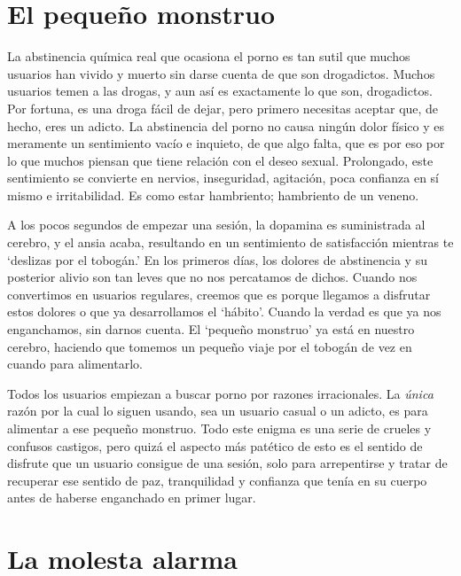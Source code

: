 \documentclass[
  spanish,
  openany]{book}
\begin{document}
\hypertarget{el-pequeuxf1o-monstruo}{%
\section{El pequeño monstruo}\label{el-pequeuxf1o-monstruo}}

La abstinencia química real que ocasiona el porno es tan sutil que muchos usuarios han vivido y muerto sin darse cuenta de que son drogadictos. Muchos usuarios temen a las drogas, y aun así es exactamente lo que son, drogadictos. Por fortuna, es una droga fácil de dejar, pero primero necesitas aceptar que, de hecho, eres un adicto. La abstinencia del porno no causa ningún dolor físico y es meramente un sentimiento vacío e inquieto, de que algo falta, que es por eso por lo que muchos piensan que tiene relación con el deseo sexual. Prolongado, este sentimiento se convierte en nervios, inseguridad, agitación, poca confianza en sí mismo e irritabilidad. Es como estar hambriento; hambriento de un veneno.

A los pocos segundos de empezar una sesión, la dopamina es suministrada al cerebro, y el ansia acaba, resultando en un sentimiento de satisfacción mientras te `deslizas por el tobogán.' En los primeros días, los dolores de abstinencia y su posterior alivio son tan leves que no nos percatamos de dichos. Cuando nos convertimos en usuarios regulares, creemos que es porque llegamos a disfrutar estos dolores o que ya desarrollamos el `hábito'. Cuando la verdad es que ya nos enganchamos, sin darnos cuenta. El `pequeño monstruo' ya está en nuestro cerebro, haciendo que tomemos un pequeño viaje por el tobogán de vez en cuando para alimentarlo.

Todos los usuarios empiezan a buscar porno por razones irracionales. La \emph{única} razón por la cual lo siguen usando, sea un usuario casual o un adicto, es para alimentar a ese pequeño monstruo. Todo este enigma es una serie de crueles y confusos castigos, pero quizá el aspecto más patético de esto es el sentido de disfrute que un usuario consigue de una sesión, solo para arrepentirse y tratar de recuperar ese sentido de paz, tranquilidad y confianza que tenía en su cuerpo antes de haberse enganchado en primer lugar.

\hypertarget{la-molesta-alarma}{%
\section{La molesta alarma}\label{la-molesta-alarma}}
\end{document}
